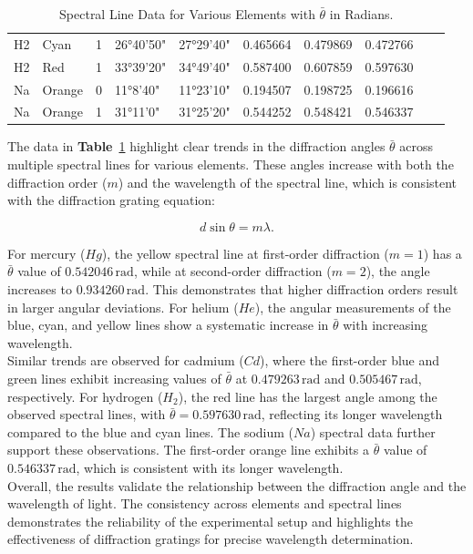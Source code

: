 \documentclass[a4paper,11pt]{article}
\begin{document}
\begin{table}[H]
\begin{tabular}{llllllllll}
  H2  & Cyan   & 1 & 26°40'50" & 27°29'40"  & 0.465664 & 0.479869 & 0.472766 \\
  H2  & Red          & 1 & 33°39'20" & 34°49'40"  & 0.587400 & 0.607859 & 0.597630 \\
  \hline
  Na  & Orange       & 0 & 11°8'40"  & 11°23'10"  & 0.194507 & 0.198725 & 0.196616 \\
  Na  & Orange       & 1 & 31°11'0"  & 31°25'20"  & 0.544252 & 0.548421 & 0.546337 \\
  \bottomrule
  \end{tabular}
  \caption{Spectral Line Data for Various Elements with \(\bar \theta\) in Radians.}
  \label{tab:spectral_data_elements}
\end{table}

\newpage
The data in \textbf{Table}~\ref{tab:spectral_data_elements} highlight clear trends in the diffraction angles \(\bar{\theta}\) across multiple spectral lines for various elements. These angles increase with both the diffraction order (\(m\)) and the wavelength of the spectral line, which is consistent with the diffraction grating equation:

\[
d \sin \theta = m \lambda.
\]

For mercury (\(Hg\)), the yellow spectral line at first-order diffraction (\(m = 1\)) has a \(\bar{\theta}\) value of \(0.542046 \, \text{rad}\), while at second-order diffraction (\(m = 2\)), the angle increases to \(0.934260 \, \text{rad}\). This demonstrates that higher diffraction orders result in larger angular deviations. For helium (\(He\)), the angular measurements of the blue, cyan, and yellow lines show a systematic increase in \(\bar{\theta}\) with increasing wavelength.\\

Similar trends are observed for cadmium (\(Cd\)), where the first-order blue and green lines exhibit increasing values of \(\bar{\theta}\) at \(0.479263 \, \text{rad}\) and \(0.505467 \, \text{rad}\), respectively. For hydrogen (\(H_2\)), the red line has the largest angle among the observed spectral lines, with \(\bar{\theta} = 0.597630 \, \text{rad}\), reflecting its longer wavelength compared to the blue and cyan lines. The sodium (\(Na\)) spectral data further support these observations. The first-order orange line exhibits a \(\bar{\theta}\) value of \(0.546337 \, \text{rad}\), which is consistent with its longer wavelength. \\

Overall, the results validate the relationship between the diffraction angle and the wavelength of light. The consistency across elements and spectral lines demonstrates the reliability of the experimental setup and highlights the effectiveness of diffraction gratings for precise wavelength determination.
\end{document}
